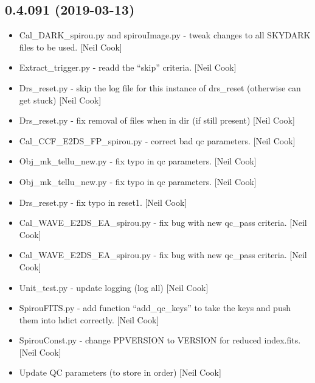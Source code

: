 \documentclass[a4paper,10pt,english]{report}
\begin{document}
\subsection{0.4.091 (2019-03-13)}
\label{\detokenize{misc/changelog:id167}}\begin{itemize}
\item {} 
Cal\_DARK\_spirou.py and spirouImage.py - tweak changes to all SKYDARK
files to be used. {[}Neil Cook{]}

\item {} 
Extract\_trigger.py - readd the “skip” criteria. {[}Neil Cook{]}

\item {} 
Drs\_reset.py - skip the log file for this instance of drs\_reset
(otherwise can get stuck) {[}Neil Cook{]}

\item {} 
Drs\_reset.py - fix removal of files when in dir (if still present)
{[}Neil Cook{]}

\item {} 
Cal\_CCF\_E2DS\_FP\_spirou.py - correct bad qc parameters. {[}Neil Cook{]}

\item {} 
Obj\_mk\_tellu\_new.py - fix typo in qc parameters. {[}Neil Cook{]}

\item {} 
Obj\_mk\_tellu\_new.py - fix typo in qc parameters. {[}Neil Cook{]}

\item {} 
Drs\_reset.py - fix typo in reset1. {[}Neil Cook{]}

\item {} 
Cal\_WAVE\_E2DS\_EA\_spirou.py - fix bug with new qc\_pass criteria. {[}Neil
Cook{]}

\item {} 
Cal\_WAVE\_E2DS\_EA\_spirou.py - fix bug with new qc\_pass criteria. {[}Neil
Cook{]}

\item {} 
Unit\_test.py - update logging (log all) {[}Neil Cook{]}

\item {} 
SpirouFITS.py - add function “add\_qc\_keys” to take the keys and push
them into hdict correctly. {[}Neil Cook{]}

\item {} 
SpirouConst.py - change PPVERSION to VERSION for reduced index.fits.
{[}Neil Cook{]}

\item {} 
Update QC parameters (to store in order) {[}Neil Cook{]}


\end{itemize}
\end{document}

